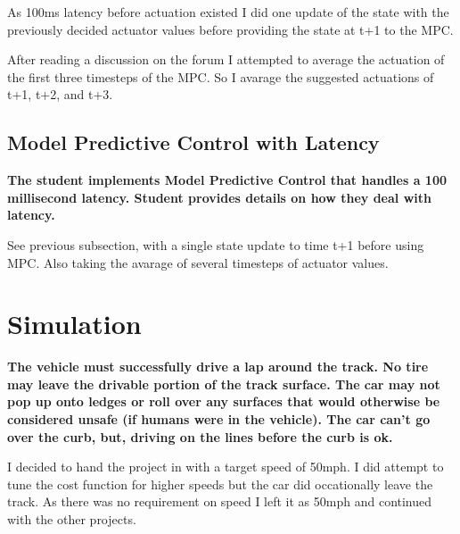 \documentclass[12pt,a4paper]{article}
\begin{document}
As 100ms latency before actuation existed I did one update of the state with the previously decided actuator values before providing the state at t+1 to the MPC.

After reading a discussion on the forum I attempted to average the actuation of the first three timesteps of the MPC. So I avarage the suggested actuations of t+1, t+2, and t+3.

\subsection{Model Predictive Control with Latency}
\textbf{The student implements Model Predictive Control that handles a 100 millisecond latency. Student provides details on how they deal with latency.}

See previous subsection, with a single state update to time t+1 before using MPC. Also taking the avarage of several timesteps of actuator values.

\section{Simulation}
\textbf{The vehicle must successfully drive a lap around the track. No tire may leave the drivable portion of the track surface. The car may not pop up onto ledges or roll over any surfaces that would otherwise be considered unsafe (if humans were in the vehicle). The car can't go over the curb, but, driving on the lines before the curb is ok.}

I decided to hand the project in with a target speed of 50mph. I did attempt to tune the cost function for higher speeds but the car did occationally leave the track. As there was no requirement on speed I left it as 50mph and continued with the other projects.
\end{document}
